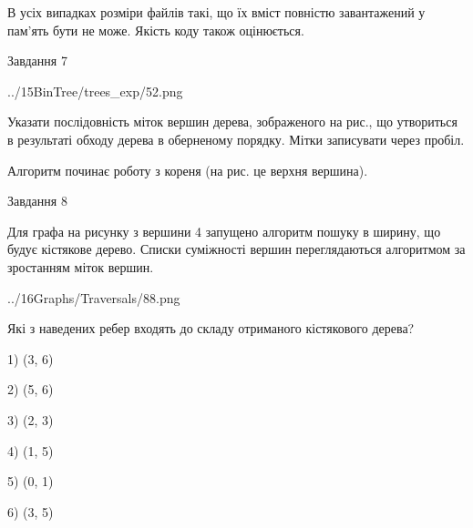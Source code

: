 \documentclass[12pt, ukrainian]{article}
\begin{document}
{В усіх випадках розміри файлів такі, що їх вміст повністю завантажений у пам'ять бути не може. Якість коду також оцінюється.



\vspace{10mm}\par

\newpage
\begin{minipage}[t]{9.7cm}
               
{\begin{center}Завдання {7}\end{center}}
\vspace{-4mm}

\begin{center}
	{../15BinTree/trees_exp/52.png}
\end{center}
Указати послідовність міток вершин дерева, зображеного на рис., що утвориться в результаті обходу дерева в оберненому порядку. Мітки записувати через пробіл.\par Алгоритм починає роботу з кореня (на рис. це верхня вершина).\par

\end{minipage}
\vline \hspace{8mm}
\begin{minipage}[t]{8.0cm}
               
{\begin{center}Завдання {8}\end{center}}
\vspace{-4mm}
Для графа на рисунку з вершини 4 запущено алгоритм пошуку в ширину, що будує кістякове дерево. Списки суміжності вершин переглядаються алгоритмом за зростанням міток вершин.\par
\begin{center}
	{../16Graphs/Traversals/88.png}
\end{center}
\par Які з наведених ребер входять до складу отриманого кістякового дерева?\par
1) (3, 6)\par
2) (5, 6)\par
3) (2, 3)\par
4) (1, 5)\par
5) (0, 1)\par
6) (3, 5)\par
{\vskip 15pt} \par


\end{minipage}}
\end{document}
